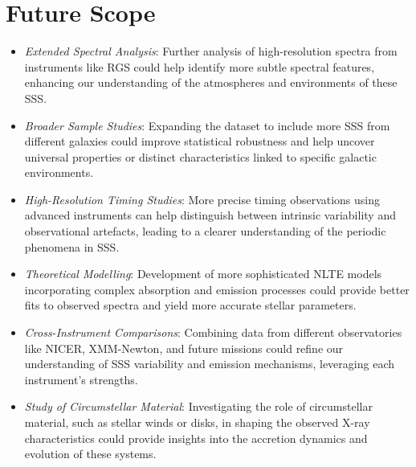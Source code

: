     \section{Future Scope}
    	\begin{itemize}
    		\item \textit{Extended Spectral Analysis}: Further analysis of high-resolution spectra from instruments like RGS could help identify more subtle spectral features, enhancing our understanding of the atmospheres and environments of these SSS.
    		
    		\item \textit{Broader Sample Studies}: Expanding the dataset to include more SSS from different galaxies could improve statistical robustness and help uncover universal properties or distinct characteristics linked to specific galactic environments.
    		
    		\item \textit{High-Resolution Timing Studies}: More precise timing observations using advanced instruments can help distinguish between intrinsic variability and observational artefacts, leading to a clearer understanding of the periodic phenomena in SSS.
    		
    		\item \textit{Theoretical Modelling}: Development of more sophisticated NLTE models incorporating complex absorption and emission processes could provide better fits to observed spectra and yield more accurate stellar parameters.
    		
    		\item \textit{Cross-Instrument Comparisons}: Combining data from different observatories like NICER, XMM-Newton, and future missions could refine our understanding of SSS variability and emission mechanisms, leveraging each instrument's strengths.
    		
    		\item \textit{Study of Circumstellar Material}: Investigating the role of circumstellar material, such as stellar winds or disks, in shaping the observed X-ray characteristics could provide insights into the accretion dynamics and evolution of these systems.
    	\end{itemize}